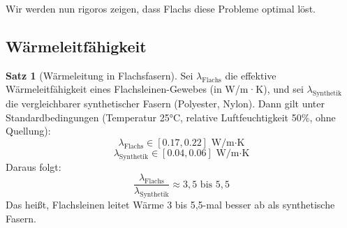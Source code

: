 \documentclass[a4paper,12pt]{article}
\theoremstyle{definition}
\newtheorem{satz}{Satz}
\begin{document}
Wir werden nun rigoros zeigen, dass Flachs diese Probleme optimal löst.

\subsection{Wärmeleitfähigkeit}

\begin{satz}[Wärmeleitung in Flachsfasern]
Sei $\lambda_{\text{Flachs}}$ die effektive Wärmeleitfähigkeit eines Flachsleinen-Gewebes (in W/m·K), und sei $\lambda_{\text{Synthetik}}$ die vergleichbarer synthetischer Fasern (Polyester, Nylon). Dann gilt unter Standardbedingungen (Temperatur 25°C, relative Luftfeuchtigkeit 50\%, ohne Quellung):
\[
\lambda_{\text{Flachs}} \in [0.17, 0.22] \text{ W/m·K}
\]
\[
\lambda_{\text{Synthetik}} \in [0.04, 0.06] \text{ W/m·K}
\]
Daraus folgt:
\[
\frac{\lambda_{\text{Flachs}}}{\lambda_{\text{Synthetik}}} \approx 3{,}5 \text{ bis } 5{,}5
\]
Das heißt, Flachsleinen leitet Wärme 3 bis 5,5-mal besser ab als synthetische Fasern.
\end{satz}
\end{document}
